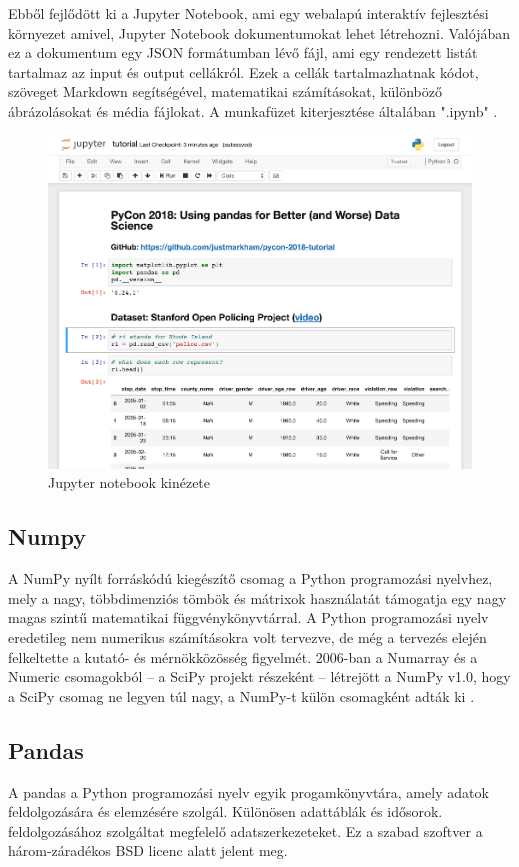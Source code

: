 Ebből fejlődött ki a Jupyter Notebook, ami egy webalapú interaktív fejlesztési környezet amivel, Jupyter Notebook dokumentumokat lehet létrehozni. Valójában ez a dokumentum egy JSON formátumban lévő fájl, ami egy rendezett listát tartalmaz az input és output cellákról. Ezek a cellák tartalmazhatnak kódot, szöveget Markdown segítségével, matematikai számításokat, különböző ábrázolásokat és média fájlokat. A munkafüzet kiterjesztése általában ".ipynb" \cite{project_jupyter}.

\begin{figure}[h!]
    \centering
    \includegraphics[scale=0.6]{images/2.fejezet/jupyter_notebook.png}
    \caption{Jupyter notebook kinézete}
    \label{fig:my_label}
\end{figure}

\subsection{Numpy}
A NumPy nyílt forráskódú kiegészítő csomag a Python programozási nyelvhez, mely a nagy, többdimenziós tömbök és mátrixok használatát támogatja egy nagy magas szintű matematikai függvénykönyvtárral. A Python programozási nyelv eredetileg nem numerikus számításokra volt tervezve, de még a tervezés elején felkeltette a kutató- és mérnökközösség figyelmét. 2006-ban a Numarray és a Numeric csomagokból – a SciPy projekt részeként – létrejött a NumPy v1.0, hogy a SciPy csomag ne legyen túl nagy, a NumPy-t külön csomagként adták ki \cite{numpy}.

\subsection{Pandas}
A pandas a Python programozási nyelv egyik progamkönyvtára, amely adatok feldolgozására és elemzésére szolgál. Különösen adattáblák és idősorok. feldolgozásához szolgáltat megfelelő adatszerkezeteket. Ez a szabad szoftver a három-záradékos BSD licenc alatt jelent meg.


